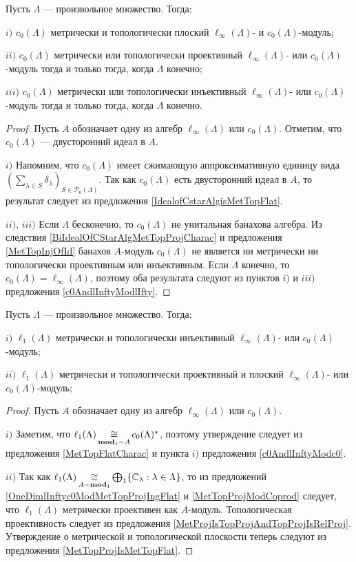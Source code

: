 \begin{proposition}\label{c0AndlInftyModc0} Пусть $\Lambda$ --- произвольное множество. Тогда:

$i)$ $c_0(\Lambda)$ метрически и топологически плоский $\ell_\infty(\Lambda)$- и $c_0(\Lambda)$-модуль;

$ii)$ $c_0(\Lambda)$ метрически или топологически проективный $\ell_\infty(\Lambda)$- или $c_0(\Lambda)$-модуль тогда и только тогда, когда $\Lambda$ конечно;

$iii)$ $c_0(\Lambda)$ метрически или топологически инъективный $\ell_\infty(\Lambda)$- или $c_0(\Lambda)$-модуль тогда и только тогда, когда $\Lambda$ конечно.
\end{proposition}
\begin{proof} Пусть $A$ обозначает одну из алгебр $\ell_\infty(\Lambda)$ или $c_0(\Lambda)$. Отметим, что $c_0(\Lambda)$ --- двусторонний идеал в $A$. 

$i)$ Напомним, что $c_0(\Lambda)$ имеет сжимающую аппроксимативную единицу вида $(\sum_{\lambda\in S}\delta_\lambda)_{S\in\mathcal{P}_0(\Lambda)}$. Так как $c_0(\Lambda)$ есть двусторонний идеал в $A$, то результат следует из предложения \ref{IdealofCstarAlgisMetTopFlat}.

$ii)$, $iii)$ Если $\Lambda$ бесконечно, то $c_0(\Lambda)$ не унитальная банахова алгебра. Из следствия \ref{BiIdealOfCStarAlgMetTopProjCharac} и предложения \ref{MetTopInjOfId} банахов $A$-модуль $c_0(\Lambda)$ не является ни метрически ни топологически проективным или инъективным. Если $\Lambda$ конечно, то $c_0(\Lambda)=\ell_\infty(\Lambda)$, поэтому оба результата следуют из пунктов $i)$ и $iii)$ предложения \ref{c0AndlInftyModlIfty}.
\end{proof}

\begin{proposition}\label{c0AndlInftyModl1} Пусть $\Lambda$ --- произвольное множество. Тогда:

$i)$ $\ell_1(\Lambda)$ метрически и топологически инъективный $\ell_\infty(\Lambda)$- или $c_0(\Lambda)$-модуль;

$ii)$ $\ell_1(\Lambda)$ метрически и топологически проективный и плоский $\ell_\infty(\Lambda)$- или $c_0(\Lambda)$-модуль;
\end{proposition}
\begin{proof} Пусть $A$ обозначает одну из алгебр $\ell_\infty(\Lambda)$ или $c_0(\Lambda)$.

$i)$ Заметим, что $\ell_1(\Lambda)\mathop{\mathbin{\cong}}\limits_{\mathbf{mod}_1-A}c_0(\Lambda)^*$, поэтому утверждение следует из предложения \ref{MetTopFlatCharac} и пункта $i)$ предложения \ref{c0AndlInftyModc0}.

$ii)$ Так как $\ell_1(\Lambda)\mathop{\mathbin{\cong}}\limits_{A-\mathbf{mod}_1}\bigoplus_1\{\mathbb{C}_\lambda:\lambda\in\Lambda\}$, то из предложений \ref{OneDimlInftyc0ModMetTopProjIngFlat} и \ref{MetTopProjModCoprod} следует, что $\ell_1(\Lambda)$ метрически проективен как $A$-модуль. Топологическая проективность следует из предложения \ref{MetProjIsTopProjAndTopProjIsRelProj}. Утверждение о метрической и топологической плоскости теперь следуют из предложения \ref{MetTopProjIsMetTopFlat}.
\end{proof}

